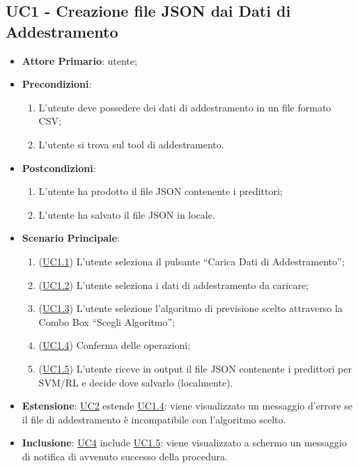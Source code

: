 	\subsection{UC1 - Creazione file JSON dai Dati di Addestramento}
		\begin{itemize}
			\item\textbf{Attore Primario}: utente;
			\item\textbf{Precondizioni}: 
				\begin{enumerate}
					\item L’utente deve possedere dei dati di addestramento in un file formato CSV;
					\item L’utente si trova sul tool di addestramento.
				\end{enumerate}
			\item\textbf{Postcondizioni}:
				\begin{enumerate}
					\item L’utente ha prodotto il file JSON contenente i predittori;
					\item L’utente ha salvato il file JSON in locale.
				\end{enumerate}
			\item\textbf{Scenario Principale}:
				\begin{enumerate}
					\item (\hyperref[par:UC1.1]{UC1.1}) L’utente seleziona il pulsante “Carica Dati di Addestramento”;
					\item (\hyperref[par:UC1.2]{UC1.2}) L’utente seleziona i dati di addestramento da caricare;
					\item (\hyperref[par:UC1.3]{UC1.3}) L’utente selezione l’algoritmo di previsione scelto attraverso la Combo Box “Scegli Algoritmo”; 
					\item (\hyperref[par:UC1.4]{UC1.4}) Conferma delle operazioni; 
					\item (\hyperref[par:UC1.5]{UC1.5}) L’utente riceve in output il file JSON contenente i predittori per SVM/RL e decide dove salvarlo (localmente).  
				\end{enumerate}
			\item\textbf{Estensione}: \hyperref[par:UC2]{UC2} estende \hyperref[par:UC1.4]{UC1.4}: viene visualizzato un messaggio d’errore se il file di addestramento è incompatibile con l’algoritmo scelto. 
			\item\textbf{Inclusione}: \hyperref[par:UC4]{UC4} include \hyperref[par:UC1.5]{UC1.5}: viene visualizzato a schermo un messaggio di notifica di avvenuto successo della procedura.
		\end{itemize}
		
